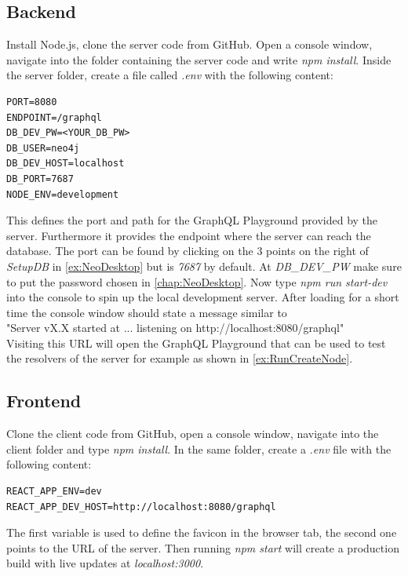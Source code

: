 \subsection{Backend}
Install Node.js, clone the server \cite{GitServer} code from GitHub. Open a console window, navigate into the folder containing the server code and write \emph{npm install}. Inside the server folder, create a file called \emph{.env} with the following content:
\begin{lstlisting}
PORT=8080
ENDPOINT=/graphql
DB_DEV_PW=<YOUR_DB_PW>
DB_USER=neo4j
DB_DEV_HOST=localhost
DB_PORT=7687
NODE_ENV=development
\end{lstlisting}
This defines the port and path for the GraphQL Playground provided by the server. Furthermore it provides the endpoint where the server can reach the database. The port can be found by clicking on the 3 points on the right of \emph{SetupDB} in \autoref{ex:NeoDesktop} but is \emph{7687} by default. At \emph{DB\_DEV\_PW} make sure to put the password chosen in \autoref{chap:NeoDesktop}.
Now type \emph{npm run start-dev} into the console to spin up the local development server. After loading for a short time the console window should state a message similar to \\
"Server vX.X started at ... listening on http://localhost:8080/graphql" \\
Visiting this URL will open the GraphQL Playground that can be used to test the resolvers of the server for example as shown in \autoref{ex:RunCreateNode}.

\subsection{Frontend}
Clone the client \cite{GitClient} code from GitHub, open a console window, navigate into the client folder and type \emph{npm install}. In the same folder, create a \emph{.env} file with the following content:
\begin{lstlisting}
REACT_APP_ENV=dev
REACT_APP_DEV_HOST=http://localhost:8080/graphql
\end{lstlisting}
The first variable is used to define the favicon in the browser tab, the second one points to the URL of the server. Then running \emph{npm start} will create a production build with live updates at \emph{localhost:3000}.

